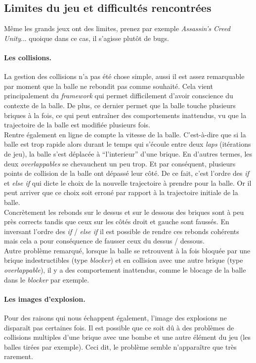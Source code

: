 \documentclass[a4paper,10pt]{article}
\begin{document}
\subsection{Limites du jeu et difficultés rencontrées}


Même les grands jeux ont des limites, prenez par exemple \textit{Assassin's Creed Unity}... quoique dans ce cas,
il s'agisse plutôt de bugs.

\paragraph{Les collisions.}
La gestion des collisions n'a pas été chose simple, aussi il est assez remarquable par moment que la balle
ne rebondit pas comme souhaité. Cela vient principalement du \textit{framework} qui permet difficilement d'avoir
conscience du contexte de la balle. De plus, ce dernier permet que la balle touche plusieurs briques à la fois,
ce qui peut entraîner des comportements inattendus, vu que la trajectoire de la balle est modifiée plusieurs fois. \\

Rentre également en ligne de compte la vitesse de la balle. C'est-à-dire que si la balle est trop rapide alors durant
le temps qui s'écoule entre deux \textit{laps} (itérations de jeu), la balle s'est déplacée à ``l'interieur'' d'une brique.
En d'autres termes, les
deux \textit{overlappables} se chevauchent un peu trop. Et par conséquent, plusieurs
points de collision de la balle ont dépassé leur côté. De ce fait, c'est l'ordre des \textit{if} et \textit{else if} qui dicte
le choix de la nouvelle trajectoire à prendre pour la balle. Or il peut arriver que ce choix soit erroné par rapport à la
trajectoire initiale de la balle.\\
Concrètement les rebonds sur le dessus et sur le dessous des briques sont à peu près corrects tandis que ceux sur
les côtés droit et gauche sont faussés. En inversant l'ordre des \textit{if} / \textit{else if} il est possible de rendre
ces rebonds cohérents mais cela a pour conséquence de fausser ceux du dessus / dessous. \\

Autre problème remarqué, lorsque la balle se retrouvent à la fois bloquée par une brique indestructibles (type \textit{blocker})
et en collision avec une autre brique (type \textit{overlappable}), il y a des comportement inattendus, comme le blocage
de la balle dans le \textit{blocker} par exemple.

\paragraph{Les images d'explosion.}
Pour des raisons qui nous échappent également, l'image des explosions ne disparaît pas certaines fois. Il est possible
que ce soit dû à des problèmes de collisions multiples d'une brique avec une bombe et une autre élément du jeu (les
balles tirées par exemple). Ceci dit, le problème semble n'apparaître que très rarement.
\end{document}
